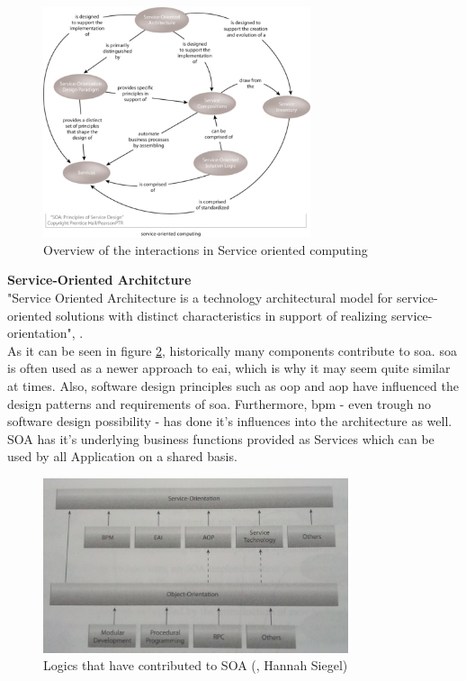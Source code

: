 \documentclass[12pt]{article}
\begin{document}
\begin{figure}[here!]
	\centering
	\includegraphics[width=0.7\textwidth]{images/serviceorientationdotcomwhatissoa}
	\caption{Overview of the interactions in Service oriented computing \cite{photos}}
	\label{fig:serviceorientedcomuting}
	\end{figure}
	\FloatBarrier\noindent
\textbf{Service-Oriented Architcture}\\
"Service Oriented Architecture is a technology architectural model for service-oriented solutions with distinct characteristics in support of realizing service-orientation", \cite[page 27]{grau}. \\
As it can be seen in figure \ref{fig:eaipartofso}, historically many components contribute to \gls{soa}. \gls{soa} is often used as a newer approach to \gls{eai}, which is why it may seem quite similar at times.  \cite{soaitwissen} Also, software design principles such as \gls{oop} and \gls{aop} have influenced the design patterns and requirements of \gls{soa}. Furthermore, \gls{bpm} - even trough no software design possibility - has done it's influences into the architecture as well. \\
SOA has it's underlying business functions provided as Services which can be used by all Application on a shared basis. 
\begin{figure}[here!]
	\centering
	\includegraphics[width=0.8\textwidth]{images/b1_25}
	\caption{Logics that have contributed to SOA (\cite[page 25]{grau}, Hannah Siegel)}
	\label{fig:eaipartofso}
	\end{figure}
\end{document}
